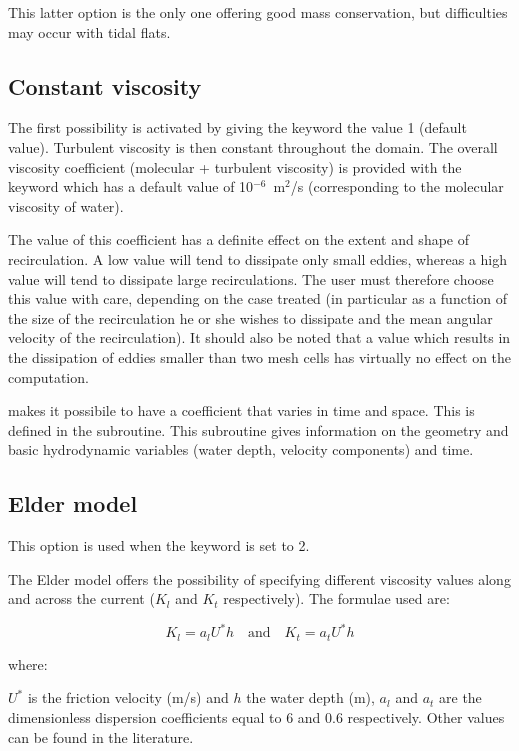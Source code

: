 This latter option is the only one offering good mass conservation,
but difficulties may occur with tidal flats.


\subsection{Constant viscosity}

The first possibility is activated by giving the keyword
 the value 1 (default value).
Turbulent viscosity is then constant throughout the domain.
The overall viscosity coefficient (molecular + turbulent viscosity) is provided
with the keyword  which has a default value of
10$^{-6}$~m$^2$/s (corresponding to the molecular viscosity of water).

The value of this coefficient has a definite effect on the extent and shape of
recirculation.
A low value will tend to dissipate only small eddies, whereas a high value will
tend to dissipate large recirculations.
The user must therefore choose this value with care, depending on the case
treated (in particular as a function of the size of the recirculation he or she
wishes to dissipate and the mean angular velocity of the recirculation).
It should also be noted that a value which results in the dissipation of eddies
smaller than two mesh cells has virtually no effect on the computation.

 makes it possibile to have a coefficient that varies in time and
space.
This is defined in the  subroutine.
This subroutine gives information on the geometry and basic hydrodynamic
variables (water depth, velocity components) and time.


\subsection{Elder model}

This option is used when the keyword  is set to 2.

The Elder model offers the possibility of specifying different viscosity values
along and across the current ($K_l$ and $K_t$ respectively).
The formulae used are:

\begin{equation}
  K_l = a_l U^* h  \textrm{~~~and~~~}  K_t = a_t U^* h
\end{equation}

where:

$U^*$ is the friction velocity (m/s) and $h$ the water depth (m),
$a_l$ and $a_t$ are the dimensionless dispersion coefficients equal to 6 and 0.6
respectively.
Other values can be found in the literature.

